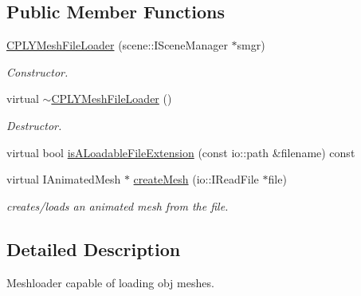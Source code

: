 \subsection*{Public Member Functions}
\begin{DoxyCompactItemize}
\item 
\hypertarget{classirr_1_1scene_1_1_c_p_l_y_mesh_file_loader_a443b02815f0ac3c5f989f345b4cbd5dd}{\hyperlink{classirr_1_1scene_1_1_c_p_l_y_mesh_file_loader_a443b02815f0ac3c5f989f345b4cbd5dd}{C\-P\-L\-Y\-Mesh\-File\-Loader} (scene\-::\-I\-Scene\-Manager $\ast$smgr)}\label{classirr_1_1scene_1_1_c_p_l_y_mesh_file_loader_a443b02815f0ac3c5f989f345b4cbd5dd}

\begin{DoxyCompactList}\small\item\em Constructor. \end{DoxyCompactList}\item 
\hypertarget{classirr_1_1scene_1_1_c_p_l_y_mesh_file_loader_a30d3bbc78014b6a8e8c4dbca25a2ec61}{virtual \hyperlink{classirr_1_1scene_1_1_c_p_l_y_mesh_file_loader_a30d3bbc78014b6a8e8c4dbca25a2ec61}{$\sim$\-C\-P\-L\-Y\-Mesh\-File\-Loader} ()}\label{classirr_1_1scene_1_1_c_p_l_y_mesh_file_loader_a30d3bbc78014b6a8e8c4dbca25a2ec61}

\begin{DoxyCompactList}\small\item\em Destructor. \end{DoxyCompactList}\item 
virtual bool \hyperlink{classirr_1_1scene_1_1_c_p_l_y_mesh_file_loader_a0cef8ab347e8e14fd691f2f86bdbdd0a}{is\-A\-Loadable\-File\-Extension} (const io\-::path \&filename) const 
\item 
\hypertarget{classirr_1_1scene_1_1_c_p_l_y_mesh_file_loader_ae16104fedae0ac427277089ac07adb94}{virtual I\-Animated\-Mesh $\ast$ \hyperlink{classirr_1_1scene_1_1_c_p_l_y_mesh_file_loader_ae16104fedae0ac427277089ac07adb94}{create\-Mesh} (io\-::\-I\-Read\-File $\ast$file)}\label{classirr_1_1scene_1_1_c_p_l_y_mesh_file_loader_ae16104fedae0ac427277089ac07adb94}

\begin{DoxyCompactList}\small\item\em creates/loads an animated mesh from the file. \end{DoxyCompactList}\end{DoxyCompactItemize}


\subsection{Detailed Description}
Meshloader capable of loading obj meshes. 

